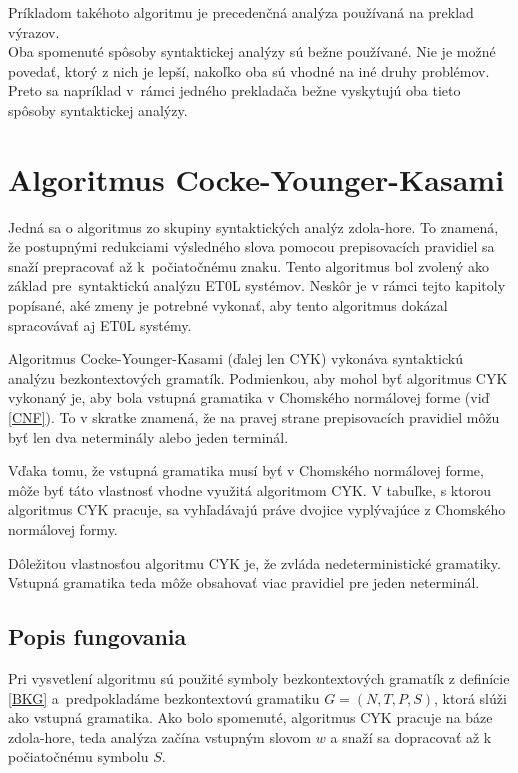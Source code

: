 Príkladom takéhoto algoritmu je precedenčná analýza používaná na preklad výrazov.
\hfill\\

Oba spomenuté spôsoby syntaktickej analýzy sú bežne používané. Nie je možné povedať, ktorý z nich je lepší, nakoľko oba sú vhodné na iné druhy problémov. Preto sa napríklad v~rámci jedného prekladača bežne vyskytujú oba tieto spôsoby syntaktickej analýzy.

\section{Algoritmus Cocke-Younger-Kasami}
\label{CYK}
Jedná sa o algoritmus zo skupiny syntaktických analýz zdola-hore. To znamená, že postupnými redukciami výsledného slova pomocou prepisovacích pravidiel sa snaží prepracovať až k~počiatočnému znaku. Tento algoritmus bol zvolený ako základ pre~syntaktickú analýzu ET0L systémov. Neskôr je v rámci tejto kapitoly popísané, aké zmeny je potrebné vykonať, aby tento algoritmus dokázal spracovávať aj ET0L systémy.

Algoritmus Cocke-Younger-Kasami (ďalej len CYK) vykonáva syntaktickú analýzu bezkontextových gramatík. Podmienkou, aby mohol byť algoritmus CYK vykonaný je, aby bola vstupná gramatika v Chomského normálovej forme (viď \ref{CNF}). To v skratke znamená, že na pravej strane prepisovacích pravidiel môžu byť len dva neterminály alebo jeden terminál.

Vďaka tomu, že vstupná gramatika musí byť v Chomského normálovej forme, môže byť táto vlastnosť vhodne využitá algoritmom CYK. V tabuľke, s ktorou algoritmus CYK pracuje, sa vyhľadávajú práve dvojice vyplývajúce z Chomského normálovej formy.

Dôležitou vlastnosťou algoritmu CYK je, že zvláda nedeterministické gramatiky. Vstupná gramatika teda môže obsahovať viac pravidiel pre jeden neterminál.


\subsection*{Popis fungovania}

Pri vysvetlení algoritmu sú použité symboly bezkontextových gramatík z definície \ref{BKG} a~predpokladáme bezkontextovú gramatiku $G = (N, T, P, S)$, ktorá slúži ako vstupná gramatika.
Ako bolo spomenuté, algoritmus CYK pracuje na báze zdola-hore, teda analýza začína vstupným slovom $w$ a snaží sa dopracovať až k počiatočnému symbolu $S$.

